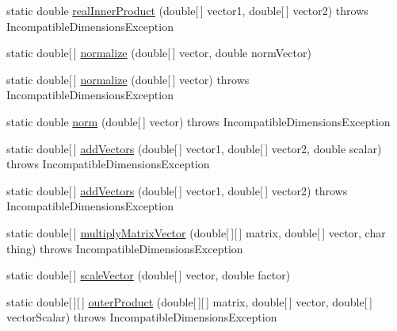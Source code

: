 \begin{DoxyCompactItemize}
\item 
static double \hyperlink{classOMP2D_1_1MatrixOperations_a0ffd0bed3beb6b14b1e6c80259fdb2fc}{real\-Inner\-Product} (double\mbox{[}$\,$\mbox{]} vector1, double\mbox{[}$\,$\mbox{]} vector2)  throws Incompatible\-Dimensions\-Exception 
\item 
static double\mbox{[}$\,$\mbox{]} \hyperlink{classOMP2D_1_1MatrixOperations_a9f4c857451b167cc252827d17cd1413c}{normalize} (double\mbox{[}$\,$\mbox{]} vector, double norm\-Vector)
\item 
static double\mbox{[}$\,$\mbox{]} \hyperlink{classOMP2D_1_1MatrixOperations_a435ecf7d2a5c1dff9f70ef542b17804b}{normalize} (double\mbox{[}$\,$\mbox{]} vector)  throws Incompatible\-Dimensions\-Exception 
\item 
static double \hyperlink{classOMP2D_1_1MatrixOperations_ad4e2f7e46255b1af0dc78b06151ce0a1}{norm} (double\mbox{[}$\,$\mbox{]} vector)  throws Incompatible\-Dimensions\-Exception 
\item 
static double\mbox{[}$\,$\mbox{]} \hyperlink{classOMP2D_1_1MatrixOperations_a4fbee19c7844db28af5203a2b6087206}{add\-Vectors} (double\mbox{[}$\,$\mbox{]} vector1, double\mbox{[}$\,$\mbox{]} vector2, double scalar)  throws Incompatible\-Dimensions\-Exception 
\item 
static double\mbox{[}$\,$\mbox{]} \hyperlink{classOMP2D_1_1MatrixOperations_aaeb17605f361eadab3ffb12918d24496}{add\-Vectors} (double\mbox{[}$\,$\mbox{]} vector1, double\mbox{[}$\,$\mbox{]} vector2)  throws Incompatible\-Dimensions\-Exception 
\item 
static double\mbox{[}$\,$\mbox{]} \hyperlink{classOMP2D_1_1MatrixOperations_aaa1507cc4bd3d390fea146ab29abb5bf}{multiply\-Matrix\-Vector} (double\mbox{[}$\,$\mbox{]}\mbox{[}$\,$\mbox{]} matrix, double\mbox{[}$\,$\mbox{]} vector, char thing)  throws Incompatible\-Dimensions\-Exception 
\item 
static double\mbox{[}$\,$\mbox{]} \hyperlink{classOMP2D_1_1MatrixOperations_af63d77a6ef1d2bae746c7f47099f01ed}{scale\-Vector} (double\mbox{[}$\,$\mbox{]} vector, double factor)
\item 
static double\mbox{[}$\,$\mbox{]}\mbox{[}$\,$\mbox{]} \hyperlink{classOMP2D_1_1MatrixOperations_a3f7a1739a39b7bc42567c8011694bb5f}{outer\-Product} (double\mbox{[}$\,$\mbox{]}\mbox{[}$\,$\mbox{]} matrix, double\mbox{[}$\,$\mbox{]} vector, double\mbox{[}$\,$\mbox{]} vector\-Scalar)  throws Incompatible\-Dimensions\-Exception 
\item 

\end{DoxyCompactItemize}
